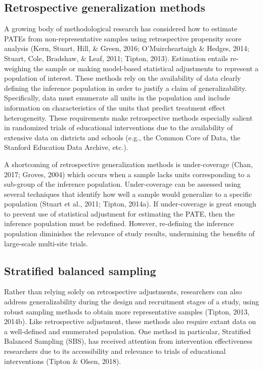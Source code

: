 \documentclass[
  man,floatsintext]{apa6}
\begin{document}
\hypertarget{retrospective-generalization-methods}{%
\subsection*{Retrospective generalization methods}\label{retrospective-generalization-methods}}

A growing body of methodological research has considered how to estimate PATEs from non-representative samples using retrospective propensity score analysis (Kern, Stuart, Hill, \& Green, 2016; O'Muircheartaigh \& Hedges, 2014; Stuart, Cole, Bradshaw, \& Leaf, 2011; Tipton, 2013). Estimation entails re-weighing the sample or making model-based statistical adjustments to represent a population of interest.
These methods rely on the availability of data clearly defining the inference population in order to justify a claim of generalizability. Specifically, data must enumerate all units in the population and include information on characteristics of the units that predict treatment effect heterogeneity. These requirements make retrospective methods especially salient in randomized trials of educational interventions due to the availability of extensive data on districts and schools (e.g., the Common Core of Data, the Stanford Education Data Archive, etc.).

A shortcoming of retrospective generalization methods is under-coverage (Chan, 2017; Groves, 2004) which occurs when a sample lacks units corresponding to a sub-group of the inference population. Under-coverage can be assessed using several techniques that identify how well a sample would generalize to a specific population (Stuart et al., 2011; Tipton, 2014a). If under-coverage is great enough to prevent use of statistical adjustment for estimating the PATE, then the inference population must be redefined. However, re-defining the inference population diminishes the relevance of study results, undermining the benefits of large-scale multi-site trials.

\hypertarget{stratified-balanced-sampling}{%
\subsection*{Stratified balanced sampling}\label{stratified-balanced-sampling}}

Rather than relying solely on retrospective adjustments, researchers can also address generalizability during the design and recruitment stages of a study, using robust sampling methods to obtain more representative samples (Tipton, 2013, 2014b). Like retrospective adjustment, these methods also require extant data on a well-defined and enumerated population.
One method in particular, Stratified Balanced Sampling (SBS), has received attention from intervention effectiveness researchers due to its accessibility and relevance to trials of educational interventions (Tipton \& Olsen, 2018).
\end{document}
